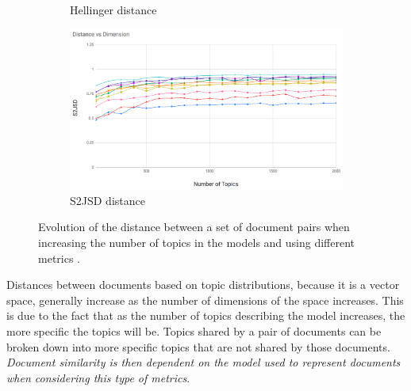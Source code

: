 \begin{figure}[ht]
\begin{subfigure}[b]{0.5\linewidth}
\caption{Hellinger distance}
\vspace{4ex}
\end{subfigure}
\begin{subfigure}[b]{0.5\linewidth}
\centering
\includegraphics[width=\linewidth]{S2JSD_100_2k.png}
\caption{S2JSD distance}
\vspace{4ex}
\end{subfigure}
\caption{Evolution of the distance between a set of document pairs when increasing the number of topics in the models and using different metrics \citep{Badenes-Olmedo2020}.}
\label{fig:topic_distances}
\end{figure}


Distances between documents based on topic distributions, because it is a vector space, generally increase as the number of dimensions of the space increases. This is due to the fact that as the number of topics describing the model increases, the more specific the topics will be. Topics shared by a pair of documents can be broken down into more specific topics that are not shared by those documents. \textit{Document similarity is then dependent on the model used to represent documents when considering this type of metrics}. 

